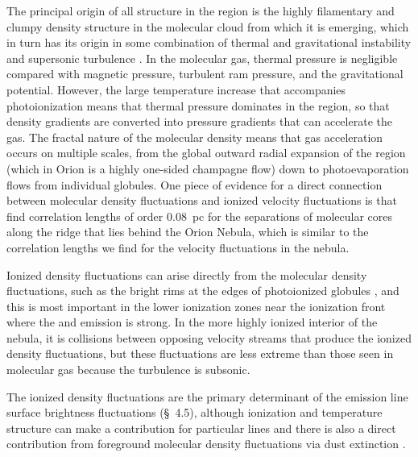 \documentclass[useAMS,usenatbib]{mn2e}
\begin{document}
The principal origin of all structure in the \hii{} region is
the highly filamentary and clumpy density structure in the molecular
cloud from which it is emerging, which in turn has its origin in some
combination of thermal and gravitational instability and supersonic
turbulence \citep{Padoan:2002a, Ballesteros:2011a}.  In the molecular
gas, thermal pressure is negligible compared with magnetic pressure,
turbulent ram pressure, and the gravitational potential.  However, the
large temperature increase that accompanies photoionization means that
thermal pressure dominates in the \hii{} region, so that density
gradients are converted into pressure gradients that can accelerate
the gas.  The fractal nature of the molecular density means that gas
acceleration occurs on multiple scales, from the global outward radial
expansion of the \hii{} region (which in Orion is a highly one-sided
champagne flow) down to photoevaporation flows from individual
globules.   One piece of evidence for a direct connection between
molecular density fluctuations and ionized velocity fluctuations is
that \citet{Kainulainen:2016a} find correlation lengths of order \(0.08\)~pc
for the separations of molecular cores along the ridge that lies
behind the Orion Nebula, which is similar to the correlation lengths
we find for the velocity fluctuations in the nebula. 

Ionized density fluctuations can arise directly from the molecular
density fluctuations, such as the bright rims at the edges of
photoionized globules \citep{Henney:2009a}, and this is most important
in the lower ionization zones near the ionization front where the
\sii{} and \nii{} emission is strong.  In the more highly ionized
interior of the nebula, it is collisions between opposing velocity
streams that produce the ionized density fluctuations, but these
fluctuations are less extreme than those seen in molecular gas because
the turbulence is subsonic.

The ionized density fluctuations are the primary determinant of the
emission line surface brightness fluctuations (\S~4.5), although
ionization and temperature structure can make a contribution for
particular lines and there is also a direct contribution from
foreground molecular density fluctuations via dust extinction
\citep{ODell:2000a}.
\end{document}
